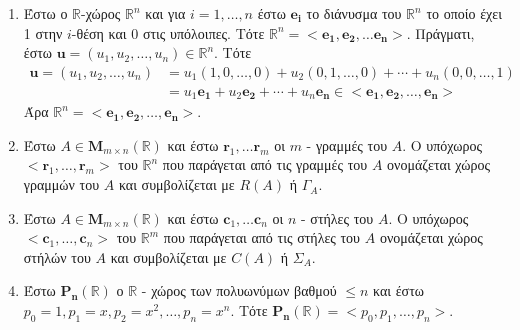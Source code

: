 \begin{examples}
\item {}
  \begin{enumerate}
    \item Έστω ο $ \mathbb{R} $-χώρος $ \mathbb{R}^{n} $ και για $ i= 1,\ldots,n $
      έστω $ \mathbf{e_{i}} $ το διάνυσμα του $ \mathbb{R}^{n} $ το οποίο έχει 
      1 στην $ i $-θέση και 0 στις υπόλοιπες. Τότε $ \mathbb{R}^{n} = 
      < \mathbf{e_{1}}, \mathbf{e_{2}}, \ldots \mathbf{e_{n}} >  $. 
      Πράγματι, έστω $ \mathbf{u} = (u_{1},u_{2},\ldots,u_{n}) \in 
      \mathbb{R}^{n} $. Τότε 
      \begin{align*}
        \mathbf{u} = (u_{1},u_{2},\ldots,u_{n}) 
                &=  u_{1} (1,0,\ldots,0) + u_{2} (0,1,\ldots,0) + 
                \cdots + u_{n} (0,0,\ldots,1) \\
                &= u_{1} \mathbf{e_{1}} + u_{2} \mathbf{e_{2}} + \cdots + u_{n} 
                \mathbf{e_{n}} \in < \mathbf{e_{1}}, \mathbf{e_{2}}, 
                \ldots, \mathbf{e_{n}} >  
      \end{align*} 
      Άρα $ \mathbb{R}^{n} = < \mathbf{e_{1}}, \mathbf{e_{2}}, 
      \ldots, \mathbf{e_{n}} >  $.
    \item Έστω $ A \in \textbf{M}_{m \times n}(\mathbb{R}) $ και έστω 
      $ \mathbf{r}_{1}, \ldots \mathbf{r}_{m} $ οι $m$ - γραμμές του $A$.  
      Ο υπόχωρος $ < \mathbf{r}_{1}, \ldots, \mathbf{r}_{m} >  $ του 
      $ \mathbb{R}^{n} $ που παράγεται από τις γραμμές του $A$ ονομάζεται 
      χώρος γραμμών του $A$ και συμβολίζεται με $ R(A) $ ή $ \Gamma_{A} $.
    \item Έστω $ A \in \textbf{M}_{m \times n}(\mathbb{R}) $ και έστω 
      $ \mathbf{c}_{1}, \ldots \mathbf{c}_{n} $ οι $n$ - στήλες του $A$.  
      Ο υπόχωρος $ < \mathbf{c}_{1}, \ldots, \mathbf{c}_{n} >  $ του 
      $ \mathbb{R}^{m} $ που παράγεται από τις στήλες του $A$ ονομάζεται 
      χώρος στήλών του $A$ και συμβολίζεται με $ C(A) $ ή $ \Sigma_{A} $.
    \item Έστω $ \mathbf{P_{n}}(\mathbb{R}) $ ο $ \mathbb{R} $ - χώρος των 
      πολυωνύμων βαθμού $ \leq n $ και έστω $ p_{0} = 1, p_{1}=x, p_{2}=x^{2}, 
      \ldots, p_{n}=x^{n} $. Τότε $ \mathbf{P_{n}}(\mathbb{R}) = 
      < p_{0}, p_{1}, \ldots, p_{n} > $.
  \end{enumerate}
\end{examples}

